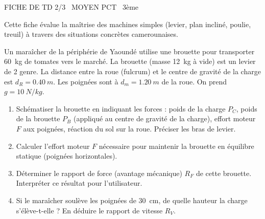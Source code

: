 \documentclass[11pt]{article}
\begin{document}
\begin{tcolorbox}[enhanced,colback=popink,colframe=popink,arc=10pt,boxrule=0pt,left=12pt,right=12pt,top=9pt,bottom=9pt]
{\color{white}\popxbold\small FICHE DE TD 2/3 \textbullet\ MOYEN \hfill PCT \textbullet\ 3ème\par}
\end{tcolorbox}
\vspace{4pt}
Cette fiche évalue la maîtrise des machines simples (levier, plan incliné, poulie, treuil) à travers des situations concrètes camerounaises.

\begin{exercice}
Un maraîcher de la périphérie de Yaoundé utilise une brouette pour transporter \SI{60}{kg} de tomates vers le marché. La brouette (masse \SI{12}{kg} à vide) est un levier de 2 genre. La distance entre la roue (fulcrum) et le centre de gravité de la charge est $d_R = \SI{0,40}{m}$. Les poignées sont à $d_m = \SI{1,20}{m}$ de la roue. On prend $g = \SI{10}{N/kg}$.
\begin{enumerate}
    \item Schématiser la brouette en indiquant les forces : poids de la charge $P_C$, poids de la brouette $P_B$ (appliqué au centre de gravité de la charge), effort moteur $F$ aux poignées, réaction du sol sur la roue. Préciser les bras de levier.
    \item Calculer l'effort moteur $F$ nécessaire pour maintenir la brouette en équilibre statique (poignées horizontales).
    \item Déterminer le rapport de force (avantage mécanique) $R_F$ de cette brouette. Interpréter ce résultat pour l'utilisateur.
    \item Si le maraîcher soulève les poignées de \SI{30}{cm}, de quelle hauteur la charge s'élève-t-elle ? En déduire le rapport de vitesse $R_V$.
\end{enumerate}
\end{exercice}
\end{document}
